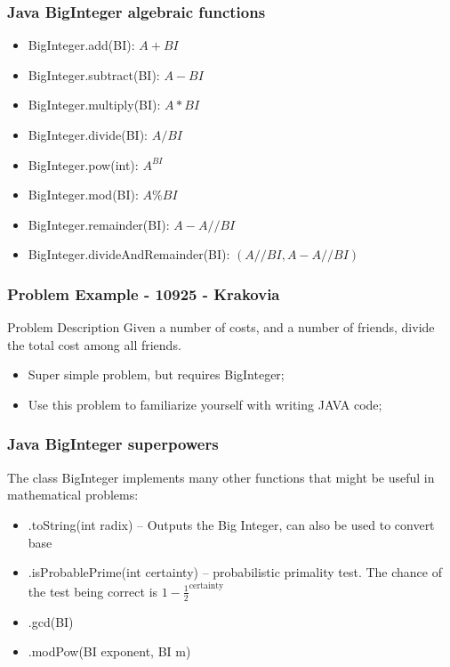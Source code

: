 \documentclass{beamer}
\begin{document}
\begin{frame}
  \frametitle{Java BigInteger algebraic functions}

  \begin{itemize}
    \item BigInteger.add(BI): \hfill $A+BI$
    \item BigInteger.subtract(BI): \hfill $A-BI$
    \item BigInteger.multiply(BI): \hfill $A*BI$
    \item BigInteger.divide(BI): \hfill $A/BI$
    \item BigInteger.pow(int): \hfill $A^{BI}$
    \item BigInteger.mod(BI): \hfill $A\%BI$
    \item BigInteger.remainder(BI): \hfill $A - A//BI$
    \item BigInteger.divideAndRemainder(BI): \hfill $(A//BI,A-A//BI)$
  \end{itemize}
\end{frame}

\begin{frame}
  \frametitle{Problem Example - 10925 - Krakovia}
  \begin{block}{Problem Description}
    Given a number of costs, and a number of friends,
    divide the total cost among all friends.
  \end{block}

  \bigskip

  \begin{itemize}
  \item Super simple problem, but requires BigInteger;
  \item Use this problem to familiarize yourself with writing JAVA
    code;
  \end{itemize}
\end{frame}

\begin{frame}
  \frametitle{Java BigInteger superpowers}

  \begin{block}{}
    The class BigInteger implements many other functions that 
    might be useful in mathematical problems:
  \end{block}


  \begin{itemize}
  \item .toString(int radix) -- Outputs the Big Integer, can also be
    used to convert base

  \item .isProbablePrime(int certainty) -- probabilistic primality
    test. The chance of the test being correct is $1-\frac{1}{2}^{\text{certainty}}$\\
    \medskip

  \item .gcd(BI)
  \item .modPow(BI exponent, BI m)  
  \end{itemize}
\end{frame}
\end{document}
